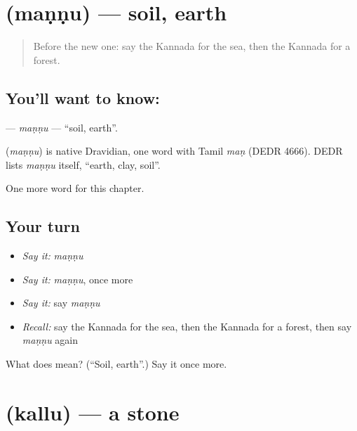 \section[\texorpdfstring{\kn{ಮಣ್ಣು} (maṇṇu)}{ಮಣ್ಣು (maṇṇu)}]{ (maṇṇu) — soil, earth}

\label{lesson:KA-C127-mannu}



\begin{quote}
Before the new one: say the Kannada for the sea, then the Kannada for a forest.
\end{quote}

\subsection*{You'll want to know: }
\textbf{} — \emph{maṇṇu} — \textquotedblleft{}soil, earth\textquotedblright{}.

\begin{cousinweb}
\textbf{} (\emph{maṇṇu}) is native Dravidian, one word with Tamil \emph{maṇ} (DEDR 4666). DEDR lists \emph{maṇṇu} itself, \textquotedblleft{}earth, clay, soil\textquotedblright{}.
\end{cousinweb}

\begin{grammarlens}[title={What you've built}]
One more word for this chapter.
\end{grammarlens}

\subsection*{Your turn}
\begin{itemize}
\raggedright
  \item \emph{Say it:} \emph{maṇṇu}
  \item \emph{Say it:} \emph{maṇṇu}, once more
  \item \emph{Say it:} say \emph{maṇṇu}
  \item \emph{Recall:} say the Kannada for the sea, then the Kannada for a forest, then say \emph{maṇṇu} again
\end{itemize}

\begin{tcolorbox}[breakable,colback=teal!4,colframe=teal!35!black,title={Before you move on}]
What does  mean? (\textquotedblleft{}Soil, earth\textquotedblright{}.) Say it once more.
\end{tcolorbox}
\section[\texorpdfstring{\kn{ಕಲ್ಲು} (kallu)}{ಕಲ್ಲು (kallu)}]{ (kallu) — a stone}

